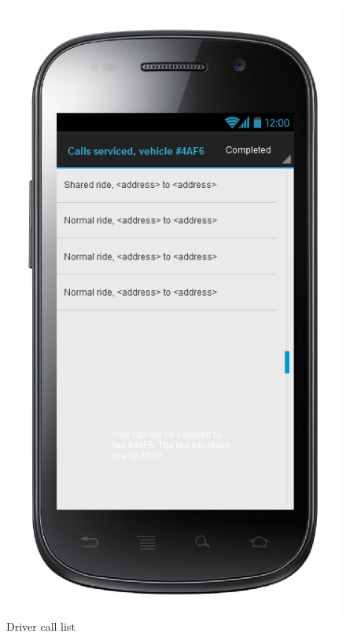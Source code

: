 \begin{figure} [h]
\centering
  	  \includegraphics[scale=0.5]{ui/Driver call list.png}
\caption{Driver call list}
   
	\end{figure}

